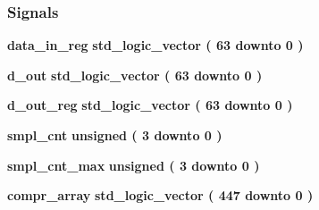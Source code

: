 \subsubsection*{Signals}
 \begin{DoxyCompactItemize}
\item 
{\bf data\+\_\+in\+\_\+reg} {\bfseries \textcolor{comment}{std\+\_\+logic\+\_\+vector}\textcolor{vhdlchar}{ }\textcolor{vhdlchar}{(}\textcolor{vhdlchar}{ }\textcolor{vhdlchar}{ } \textcolor{vhdldigit}{63} \textcolor{vhdlchar}{ }\textcolor{keywordflow}{downto}\textcolor{vhdlchar}{ }\textcolor{vhdlchar}{ } \textcolor{vhdldigit}{0} \textcolor{vhdlchar}{ }\textcolor{vhdlchar}{)}\textcolor{vhdlchar}{ }} 
\item 
{\bf d\+\_\+out} {\bfseries \textcolor{comment}{std\+\_\+logic\+\_\+vector}\textcolor{vhdlchar}{ }\textcolor{vhdlchar}{(}\textcolor{vhdlchar}{ }\textcolor{vhdlchar}{ } \textcolor{vhdldigit}{63} \textcolor{vhdlchar}{ }\textcolor{keywordflow}{downto}\textcolor{vhdlchar}{ }\textcolor{vhdlchar}{ } \textcolor{vhdldigit}{0} \textcolor{vhdlchar}{ }\textcolor{vhdlchar}{)}\textcolor{vhdlchar}{ }} 
\item 
{\bf d\+\_\+out\+\_\+reg} {\bfseries \textcolor{comment}{std\+\_\+logic\+\_\+vector}\textcolor{vhdlchar}{ }\textcolor{vhdlchar}{(}\textcolor{vhdlchar}{ }\textcolor{vhdlchar}{ } \textcolor{vhdldigit}{63} \textcolor{vhdlchar}{ }\textcolor{keywordflow}{downto}\textcolor{vhdlchar}{ }\textcolor{vhdlchar}{ } \textcolor{vhdldigit}{0} \textcolor{vhdlchar}{ }\textcolor{vhdlchar}{)}\textcolor{vhdlchar}{ }} 
\item 
{\bf smpl\+\_\+cnt} {\bfseries \textcolor{comment}{unsigned}\textcolor{vhdlchar}{ }\textcolor{vhdlchar}{(}\textcolor{vhdlchar}{ }\textcolor{vhdlchar}{ } \textcolor{vhdldigit}{3} \textcolor{vhdlchar}{ }\textcolor{keywordflow}{downto}\textcolor{vhdlchar}{ }\textcolor{vhdlchar}{ } \textcolor{vhdldigit}{0} \textcolor{vhdlchar}{ }\textcolor{vhdlchar}{)}\textcolor{vhdlchar}{ }} 
\item 
{\bf smpl\+\_\+cnt\+\_\+max} {\bfseries \textcolor{comment}{unsigned}\textcolor{vhdlchar}{ }\textcolor{vhdlchar}{(}\textcolor{vhdlchar}{ }\textcolor{vhdlchar}{ } \textcolor{vhdldigit}{3} \textcolor{vhdlchar}{ }\textcolor{keywordflow}{downto}\textcolor{vhdlchar}{ }\textcolor{vhdlchar}{ } \textcolor{vhdldigit}{0} \textcolor{vhdlchar}{ }\textcolor{vhdlchar}{)}\textcolor{vhdlchar}{ }} 
\item 
{\bf compr\+\_\+array} {\bfseries \textcolor{comment}{std\+\_\+logic\+\_\+vector}\textcolor{vhdlchar}{ }\textcolor{vhdlchar}{(}\textcolor{vhdlchar}{ }\textcolor{vhdlchar}{ } \textcolor{vhdldigit}{447} \textcolor{vhdlchar}{ }\textcolor{keywordflow}{downto}\textcolor{vhdlchar}{ }\textcolor{vhdlchar}{ } \textcolor{vhdldigit}{0} \textcolor{vhdlchar}{ }\textcolor{vhdlchar}{)}\textcolor{vhdlchar}{ }} 

\end{DoxyCompactItemize}
